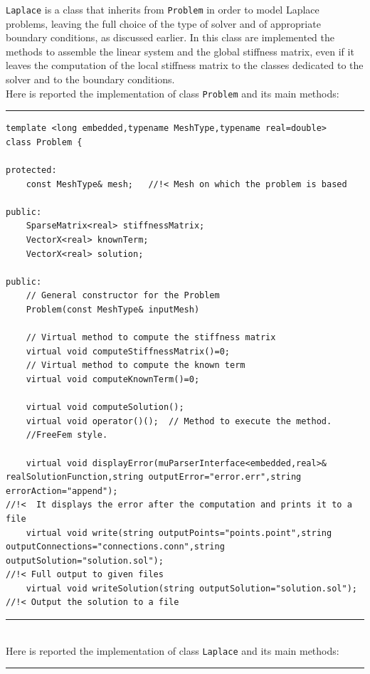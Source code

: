\verb|Laplace| is a class that inherits from \verb|Problem| in order to model Laplace problems, leaving the full choice of the type of solver and of appropriate boundary conditions, as discussed earlier. In this class are implemented the methods to assemble the linear system and the global stiffness matrix, even if it leaves the computation of the local stiffness matrix to the classes dedicated to the solver and to the boundary conditions. \\

Here is reported the implementation of class \verb|Problem| and its main methods:

\noindent\rule{16cm}{1pt}
\begin{lstlisting}[caption=File \texttt{Problem.h}]
template <long embedded,typename MeshType,typename real=double>
class Problem {
	
protected:
    const MeshType& mesh;	//!< Mesh on which the problem is based

public:
    SparseMatrix<real> stiffnessMatrix;
    VectorX<real> knownTerm;
    VectorX<real> solution;
	
public:
    // General constructor for the Problem
    Problem(const MeshType& inputMesh)

    // Virtual method to compute the stiffness matrix
    virtual void computeStiffnessMatrix()=0;
    // Virtual method to compute the known term
    virtual void computeKnownTerm()=0;	

    virtual void computeSolution();
    virtual void operator()();  // Method to execute the method.
    //FreeFem style.

    virtual void displayError(muParserInterface<embedded,real>&
realSolutionFunction,string outputError="error.err",string errorAction="append"); 
//!<  It displays the error after the computation and prints it to a file
	virtual void write(string outputPoints="points.point",string 
outputConnections="connections.conn",string outputSolution="solution.sol");	
//!< Full output to given files
	virtual void writeSolution(string outputSolution="solution.sol"); 
//!< Output the solution to a file
\end{lstlisting}
\noindent\rule{16cm}{1pt}\\

Here is reported the implementation of class \verb|Laplace| and its main methods:

\noindent\rule{16cm}{1pt}

